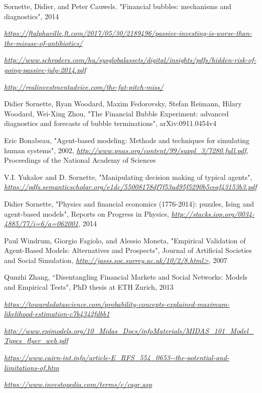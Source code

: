 
\begin{thebibliography}{99}


Sornette, Didier, and Peter Cauwels. "Financial bubbles: mechanisms and diagnostics", 2014

\textit{\url{https://ftalphaville.ft.com/2017/05/30/2189496/passive-investing-is-worse-than-the-misuse-of-antibiotics/}}

\textit{\url{http://www.schroders.com/hu/sysglobalassets/digital/insights/pdfs/hidden-risk-of-going-passive-july-2014.pdf}}	

\textit{\url{http://realinvestmentadvice.com/the-fat-pitch-miss/}}


Didier Sornette, Ryan Woodard, Maxim Fedorovsky, Stefan Reimann, Hilary Woodard, Wei-Xing Zhou, "The Financial Bubble Experiment: advanced diagnostics and forecasts of bubble terminations",  arXiv:0911.0454v4 

Eric Bonabeau, "Agent-based modeling: Methods and techniques for simulating human systems", 2002, \textit{\url{http://www.pnas.org/content/99/suppl_3/7280.full.pdf}}, Proceedings of the National Academy of Sciences

V.I. Yukalov and D. Sornette, "Manipulating decision making of typical agents", \textit{\url{https://pdfs.semanticscholar.org/e1dc/55008178df7f53ad95f5290b5ceaf43153b3.pdf}}

Didier Sornette, "Physics and financial economics (1776-2014): puzzles, Ising and agent-based models", Reports on Progress in Physics, \textit{\url{http://stacks.iop.org/0034-4885/77/i=6/a=062001}}, 2014

Paul Windrum, Giorgio Fagiolo, and Alessio Moneta, "Empirical Validation of Agent-Based Models: Alternatives and Prospects", Journal of Artificial Societies and Social Simulation, \textit{\url{http://jasss.soc.surrey.ac.uk/10/2/8.html>}}, 2007





Qunzhi Zhang, ``Disentangling Financial Markets and Social Networks: Models and Empirical Tests", PhD thesis at ETH Zurich, 2013




\textit{\url{https://towardsdatascience.com/probability-concepts-explained-maximum-likelihood-estimation-c7b4342fdbb1}}


\textit{\url{http://www.epimodels.org/10_Midas_Docs/infoMaterials/MIDAS_101_Model_Types_flyer_web.pdf}}

\textit{\url{https://www.cairn-int.info/article-E_RFS_554_0653--the-potential-and-limitations-of.htm}}


\textit{\url{https://www.investopedia.com/terms/c/cagr.asp}}

\end{thebibliography}